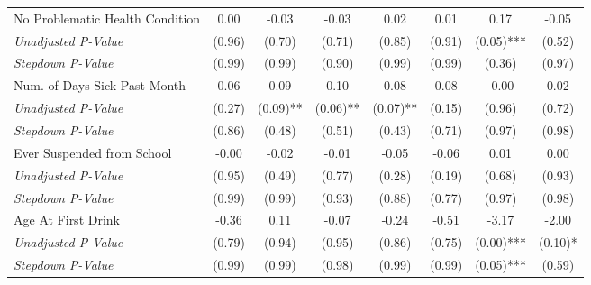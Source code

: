 \begin{tabular}{l c c c c c c c}
No Problematic Health Condition & 0.00 & -0.03 & -0.03 & 0.02 & 0.01 & 0.17 & -0.05 \\
\quad \textit{Unadjusted P-Value} & (0.96) & (0.70) & (0.71) & (0.85) & (0.91) & (0.05)*** & (0.52) \\
\quad \textit{Stepdown P-Value} & (0.99) & (0.99) & (0.90) & (0.99) & (0.99) & (0.36) & (0.97) \\
Num. of Days Sick Past Month & 0.06 & 0.09 & 0.10 & 0.08 & 0.08 & -0.00 & 0.02 \\
\quad \textit{Unadjusted P-Value} & (0.27) & (0.09)** & (0.06)** & (0.07)** & (0.15) & (0.96) & (0.72) \\
\quad \textit{Stepdown P-Value} & (0.86) & (0.48) & (0.51) & (0.43) & (0.71) & (0.97) & (0.98) \\
Ever Suspended from School & -0.00 & -0.02 & -0.01 & -0.05 & -0.06 & 0.01 & 0.00 \\
\quad \textit{Unadjusted P-Value} & (0.95) & (0.49) & (0.77) & (0.28) & (0.19) & (0.68) & (0.93) \\
\quad \textit{Stepdown P-Value} & (0.99) & (0.99) & (0.93) & (0.88) & (0.77) & (0.97) & (0.98) \\
Age At First Drink & -0.36 & 0.11 & -0.07 & -0.24 & -0.51 & -3.17 & -2.00 \\
\quad \textit{Unadjusted P-Value} & (0.79) & (0.94) & (0.95) & (0.86) & (0.75) & (0.00)*** & (0.10)* \\
\quad \textit{Stepdown P-Value} & (0.99) & (0.99) & (0.98) & (0.99) & (0.99) & (0.05)*** & (0.59) \\
\bottomrule
\end{tabular}
